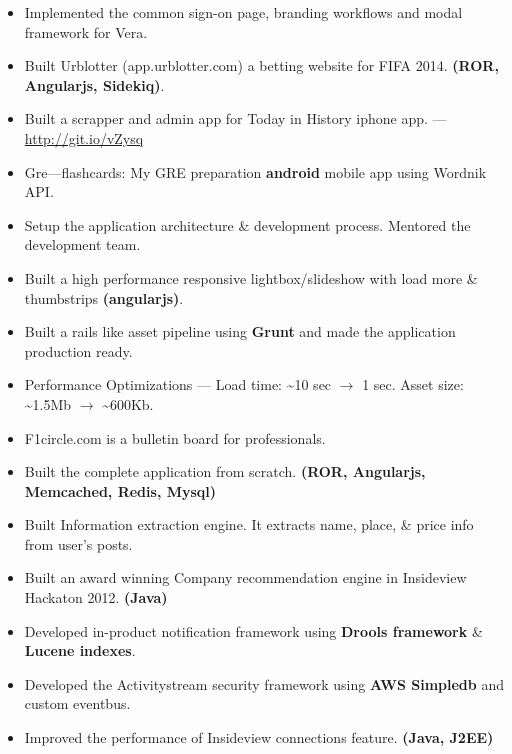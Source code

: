 \documentclass{resume}
\begin{document}
\begin{itemize} \itemsep1pt \parskip0pt
  \item Implemented the common sign-on page, branding workflows and modal framework for Vera.
  \item Built Urblotter (app.urblotter.com) a betting website for FIFA 2014. \textbf{(ROR, Angularjs, Sidekiq)}.
  \item Built a scrapper and admin app for Today in History iphone app. --- \url{http://git.io/vZysq}
  \item Gre---flashcards: My GRE preparation \textbf{android} mobile app using Wordnik API\@.
\end{itemize}
\begin{itemize} \itemsep1pt \parskip0pt
  \item Setup the application architecture \& development process. Mentored the development team.
  \item Built a high performance responsive lightbox/slideshow with load more \& thumbstrips \textbf{(angularjs)}.
  \item Built a rails like asset pipeline using \textbf{Grunt} and made the application production ready.
  \item Performance Optimizations --- Load time: \textasciitilde10 sec \( \rightarrow \) 1 sec.  
    Asset size: \textasciitilde1.5Mb \( \rightarrow \) \textasciitilde600Kb.
\end{itemize}
\begin{itemize} \itemsep1pt \parskip0pt
  \item F1circle.com is a bulletin board for professionals.
  \item Built the complete application from scratch. \textbf{(ROR, Angularjs, Memcached, Redis, Mysql)}
  \item Built Information extraction engine. It extracts name, place, \& price info from user's posts.
\end{itemize}
\begin{itemize} \itemsep1pt \parskip0pt
  \item Built an award winning Company recommendation engine in Insideview Hackaton 2012. \textbf{(Java)}
  \item Developed in-product notification framework using \textbf{Drools framework} \& \textbf{Lucene indexes}.
  \item Developed the Activitystream security framework using \textbf{AWS Simpledb} and custom eventbus.
  \item Improved the performance of Insideview connections feature. \textbf{(Java, J2EE)}
\end{itemize}
\end{document}
